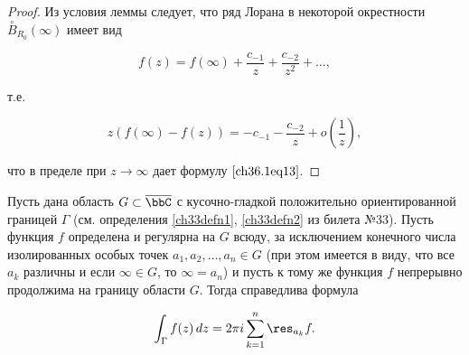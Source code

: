 \begin{proof}
Из условия леммы следует, что ряд Лорана в некоторой окрестности $\overset{\circ}{B}_{R_0}(\infty)$ имеет вид

$$
f(z) = f(\infty) + \frac{c_{-1}}{z} + \frac{c_{-2}}{z^2} + \ldots,
$$

т.е.

$$
z(f(\infty) - f(z)) = -c_{-1} - \frac{c_{-2}}{z} + o\left(\frac{1}{z}\right),
$$

что в пределе при $z \to \infty$ дает формулу $\eqref{ch36.1eq13}$.	

\end{proof}

\begin{thm}  \label{ch36.1T1}
Пусть дана область $G \subset \overline{\bbC}$ с кусочно-гладкой положительно ориентированной границей $\Gamma$ (см. определения \ref{ch33defn1}, \ref{ch33defn2} из билета №33). Пусть функция $f$ определена и регулярна на $G$ всюду, за исключением конечного числа изолированных особых точек $a_1,a_2,\ldots,a_n \in G$ (при этом имеется в виду, что все $a_k$ различны и если $\infty \in G$, то $\infty = a_n$) и пусть к тому же функция $f$ непрерывно продолжима на границу области $G$. Тогда справедлива формула

\begin{equation} \label{ch36.1eq14}
\int_\Gamma f(z) \,dz = 2 \pi i \sum_{k = 1}^{n} \res_{a_k} f.
\end{equation}

\end{thm}

